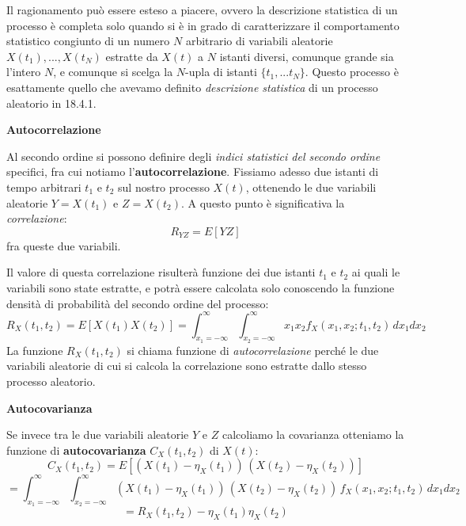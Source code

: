 \documentclass[a4paper,11pt]{article}
\begin{document}
Il ragionamento può essere esteso a piacere, ovvero la descrizione statistica di un processo è completa solo quando si è in grado di caratterizzare il comportamento statistico congiunto di un numero $N$ arbitrario di variabili aleatorie $X(t_1), ..., X(t_N)$ estratte da $X(t)$ a $N$ istanti diversi, comunque grande sia l’intero $N$, e comunque si scelga la $N$-upla di istanti $\{t_1, ... t_N\}$. Questo processo è esattamente quello che avevamo definito \textit{descrizione statistica} di un processo aleatorio in 18.4.1.

\par\smallskip

\noindent
\textbf{\textsf{Autocorrelazione}}

\noindent
Al secondo ordine si possono definire degli \textit{indici statistici del secondo ordine} specifici, fra cui notiamo l'\textbf{autocorrelazione}. Fissiamo adesso due istanti di tempo arbitrari $t_1$ e $t_2$ sul nostro processo $X(t)$, ottenendo le due variabili aleatorie $Y = X(t_1)$ e $Z = X(t_2)$. A questo punto è significativa la \textit{correlazione}:
$$
R_{YZ} = E\left[YZ\right]
$$
fra queste due variabili.

Il valore di questa correlazione risulterà funzione dei due istanti $t_1$ e $t_2$ ai quali le variabili sono state estratte, e potrà essere calcolata solo conoscendo la funzione densità di probabilità del secondo ordine del processo:
$$
R_X(t_1, t_2) = E\left[ X(t_1) X(t_2) \right] = \int_{x_1 = -\infty}^{\infty} \int_{x_2 = -\infty}^{\infty} x_1 x_2 f_X(x_1, x_2; t_1, t_2) \, dx_1 dx_2
$$
La funzione $R_X(t_1, t_2)$ si chiama funzione di \textit{autocorrelazione} perché le due variabili aleatorie di cui si calcola la correlazione sono estratte dallo stesso processo aleatorio.

\par\smallskip

\noindent
\textbf{\textsf{Autocovarianza}}

\noindent
Se invece tra le due variabili aleatorie $Y$ e $Z$ calcoliamo la covarianza otteniamo la funzione di \textbf{autocovarianza} $C_X(t_1, t_2)$ di $X(t)$:
$$
C_X(t_1, t_2) = E\left[ (X(t_1) - \eta_X(t_1)) \, (X(t_2) - \eta_X(t_2)) \right]
$$
$$
= \int_{x_1 = -\infty}^{\infty} \int_{x_2 = -\infty}^{\infty} (X(t_1) - \eta_X(t_1)) \, (X(t_2) - \eta_X(t_2)) \, f_X(x_1, x_2; t_1, t_2) \, dx_1 dx_2
$$
$$
= R_X(t_1, t_2) - \eta_X(t_1) \eta_X(t_2)
$$

\par\smallskip
\end{document}
